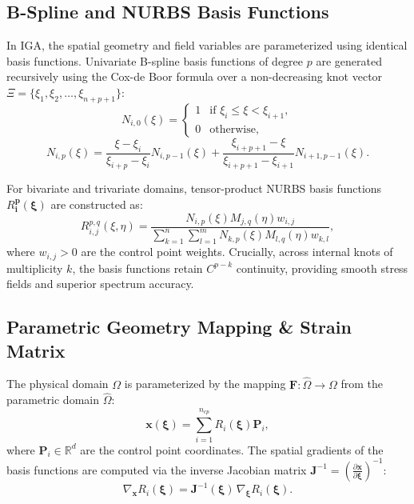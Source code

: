 \subsection{B-Spline and NURBS Basis Functions}
In IGA, the spatial geometry and field variables are parameterized using identical basis functions. Univariate B-spline basis functions of degree $p$ are generated recursively using the Cox-de Boor formula over a non-decreasing knot vector $\Xi = \{\xi_1, \xi_2, \dots, \xi_{n+p+1}\}$:
\begin{equation}
    N_{i,0}(\xi) = \begin{cases} 
    1 & \text{if } \xi_i \le \xi < \xi_{i+1}, \\
    0 & \text{otherwise},
    \end{cases}
\end{equation}
\begin{equation}
    N_{i,p}(\xi) = \frac{\xi - \xi_i}{\xi_{i+p} - \xi_i} N_{i,p-1}(\xi) + \frac{\xi_{i+p+1} - \xi}{\xi_{i+p+1} - \xi_{i+1}} N_{i+1,p-1}(\xi).
\end{equation}

For bivariate and trivariate domains, tensor-product NURBS basis functions $R_{\bm{i}}^{\bm{p}}(\bm{\xi})$ are constructed as:
\begin{equation}
    R_{i,j}^{p,q}(\xi, \eta) = \frac{N_{i,p}(\xi) M_{j,q}(\eta) w_{i,j}}{\sum_{k=1}^{n} \sum_{l=1}^{m} N_{k,p}(\xi) M_{l,q}(\eta) w_{k,l}},
\end{equation}
where $w_{i,j} > 0$ are the control point weights. Crucially, across internal knots of multiplicity $k$, the basis functions retain $C^{p-k}$ continuity, providing smooth stress fields and superior spectrum accuracy.

\subsection{Parametric Geometry Mapping \& Strain Matrix}
The physical domain $\Omega$ is parameterized by the mapping $\bm{F}: \hat{\Omega} \to \Omega$ from the parametric domain $\hat{\Omega}$:
\begin{equation}
    \bm{x}(\bm{\xi}) = \sum_{i=1}^{n_{cp}} R_i(\bm{\xi}) \bm{P}_i,
\end{equation}
where $\bm{P}_i \in \mathbb{R}^d$ are the control point coordinates. The spatial gradients of the basis functions are computed via the inverse Jacobian matrix $\bm{J}^{-1} = \left(\frac{\partial \bm{x}}{\partial \bm{\xi}}\right)^{-1}$:
\begin{equation}
    \nabla_{\bm{x}} R_i(\bm{\xi}) = \bm{J}^{-1}(\bm{\xi}) \, \nabla_{\bm{\xi}} R_i(\bm{\xi}).
\end{equation}

